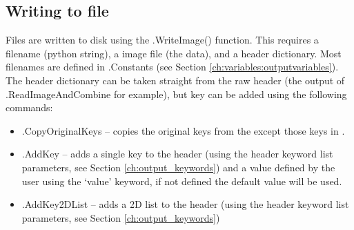 \clearpage
\newpage
\subsection{Writing to file}
\label{ch:the_recipes:gen_layout:writing_to_file}

Files are written to disk using the \spirouImage.WriteImage() function. This requires a filename (python string), a image file (the data), and a header dictionary. Most filenames are defined in \spirouConfig.Constants (see Section \ref{ch:variables:outputvariables}). The header dictionary can be taken straight from the raw  header (the output of \spirouImage.ReadImageAndCombine for example), but key can be added using the following commands:

\begin{itemize}
	\item \spirouImage.CopyOriginalKeys -- copies the original keys from the  except those keys in .

	\item \spirouImage.AddKey -- adds a single key to the header (using the header keyword list parameters, see Section \ref{ch:output_keywords}) and a value defined by the user using the `value' keyword, if not defined the default value will be used.

	\item \spirouImage.AddKey2DList -- adds a 2D list to the header (using the header keyword list parameters, see Section \ref{ch:output_keywords})
\end{itemize}

